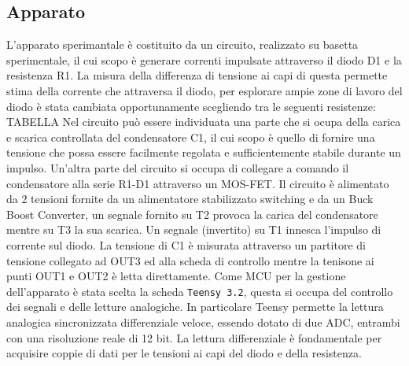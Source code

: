 \documentclass{article}[a4paper, oneside, 11pt]
\begin{document}
\subsection{Apparato}
L'apparato sperimantale è costituito da un circuito, realizzato su basetta sperimentale, il cui scopo è generare correnti impulsate attraverso il diodo D1 e la resistenza R1. La misura della differenza di tensione ai capi di questa permette stima della corrente che attraversa il diodo, per esplorare ampie zone di lavoro del diodo è stata cambiata opportunamente scegliendo tra le seguenti resistenze:\newline
TABELLA\newline
Nel circuito può essere individuata una parte che si ocupa della carica e scarica controllata del condensatore C1, il cui scopo è quello di fornire una tensione che possa essere facilmente regolata e sufficientemente stabile durante un impulso. Un'altra parte del circuito si occupa di collegare a comando il condensatore alla serie R1-D1 attraverso un MOS-FET.\newline
Il circuito è alimentato da 2 tensioni fornite da un alimentatore stabilizzato switching e da un Buck Boost Converter, un segnale fornito su T2 provoca la carica del condensatore mentre su T3 la sua scarica. Un segnale (invertito) su T1 innesca l'impulso di corrente sul diodo.\newline
La tensione di C1 è misurata attraverso un partitore di tensione collegato ad OUT3 ed alla scheda di controllo mentre la tenisone ai punti OUT1 e OUT2 è letta direttamente.\newline
Come MCU per la gestione dell'apparato è stata scelta la scheda \verb+Teensy 3.2+\cite{teensy}, questa si occupa del controllo dei segnali e delle letture analogiche. In particolare Teensy permette la lettura analogica sincronizzata differenziale veloce, essendo dotato di due ADC, entrambi con una risoluzione reale di 12 bit. La lettura differenziale è fondamentale per acquisire coppie di dati per le tensioni ai capi del diodo e della resistenza.\newline
\end{document}
